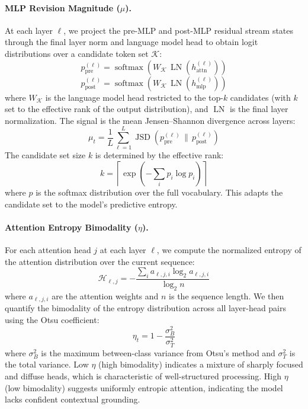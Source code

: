 \documentclass{article}
\begin{document}
\paragraph{MLP Revision Magnitude ($\mu$).}
At each layer $\ell$, we project the pre-MLP and post-MLP residual stream states through the final layer norm and language model head to obtain logit distributions over a candidate token set $\mathcal{K}$:
\begin{equation}
    p_{\text{pre}}^{(\ell)} = \operatorname{softmax}\!\left(W_{\mathcal{K}}\, \operatorname{LN}(h_{\text{attn}}^{(\ell)})\right)
    \label{eq:logit-lens-pre}
\end{equation}
\begin{equation}
    p_{\text{post}}^{(\ell)} = \operatorname{softmax}\!\left(W_{\mathcal{K}}\, \operatorname{LN}(h_{\text{mlp}}^{(\ell)})\right)
    \label{eq:logit-lens-post}
\end{equation}
where $W_{\mathcal{K}}$ is the language model head restricted to the top-$k$ candidates (with $k$ set to the effective rank of the output distribution), and $\operatorname{LN}$ is the final layer normalization. The signal is the mean Jensen--Shannon divergence across layers:
\begin{equation}
    \mu_t = \frac{1}{L} \sum_{\ell=1}^{L} \operatorname{JSD}\!\left(p_{\text{pre}}^{(\ell)} \,\|\, p_{\text{post}}^{(\ell)}\right)
    \label{eq:mlp-jsd}
\end{equation}
The candidate set size $k$ is determined by the effective rank:
\begin{equation}
    k = \left\lceil \exp\!\left(-\sum_i p_i \log p_i\right) \right\rceil
    \label{eq:effective-rank}
\end{equation}
where $p$ is the softmax distribution over the full vocabulary. This adapts the candidate set to the model's predictive entropy.

\paragraph{Attention Entropy Bimodality ($\eta$).}
For each attention head $j$ at each layer $\ell$, we compute the normalized entropy of the attention distribution over the current sequence:
\begin{equation}
    \mathcal{H}_{\ell,j} = -\frac{\sum_i a_{\ell,j,i} \log_2 a_{\ell,j,i}}{\log_2 n}
    \label{eq:attn-entropy}
\end{equation}
where $a_{\ell,j,i}$ are the attention weights and $n$ is the sequence length. We then quantify the bimodality of the entropy distribution across all layer-head pairs using the Otsu coefficient:
\begin{equation}
    \eta_t = 1 - \frac{\sigma_B^2}{\sigma_T^2}
    \label{eq:ent}
\end{equation}
where $\sigma_B^2$ is the maximum between-class variance from Otsu's method and $\sigma_T^2$ is the total variance. Low $\eta$ (high bimodality) indicates a mixture of sharply focused and diffuse heads, which is characteristic of well-structured processing. High $\eta$ (low bimodality) suggests uniformly entropic attention, indicating the model lacks confident contextual grounding.
\end{document}
